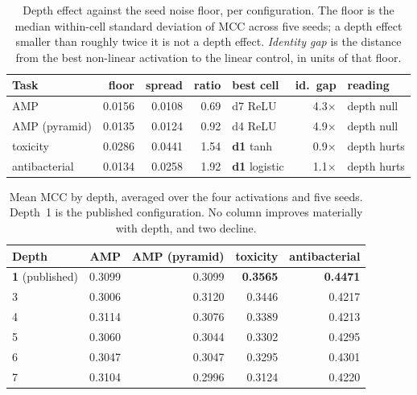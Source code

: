 \documentclass[11pt,a4paper]{article}
\begin{document}
\begin{table}[htbp]\centering\small
\caption{Depth effect against the seed noise floor, per configuration. The floor is the
median within-cell standard deviation of MCC across five seeds; a depth effect smaller than
roughly twice it is not a depth effect. \emph{Identity gap} is the distance from the best
non-linear activation to the linear control, in units of that floor.}
\label{tab:ablsummary}
\begin{tabular}{lrrrlrl}
\toprule
Task & floor & spread & ratio & best cell & id.\ gap & reading \\
\midrule
AMP            & 0.0156 & 0.0108 & 0.69 & d7 ReLU              & 4.3$\times$ & depth null \\
AMP (pyramid)  & 0.0135 & 0.0124 & 0.92 & d4 ReLU              & 4.9$\times$ & depth null \\
toxicity       & 0.0286 & 0.0441 & 1.54 & \textbf{d1} tanh     & 0.9$\times$ & depth hurts \\
antibacterial  & 0.0134 & 0.0258 & 1.92 & \textbf{d1} logistic & 1.1$\times$ & depth hurts \\
\bottomrule
\end{tabular}
\end{table}

\begin{table}[htbp]\centering\small
\caption{Mean MCC by depth, averaged over the four activations and five seeds. Depth~1 is
the published configuration. No column improves materially with depth, and two decline.}
\label{tab:abldepth}
\begin{tabular}{lrrrr}
\toprule
Depth & AMP & AMP (pyramid) & toxicity & antibacterial \\
\midrule
\textbf{1} (published) & 0.3099 & 0.3099 & \textbf{0.3565} & \textbf{0.4471} \\
3 & 0.3006 & 0.3120 & 0.3446 & 0.4217 \\
4 & 0.3114 & 0.3076 & 0.3389 & 0.4213 \\
5 & 0.3060 & 0.3044 & 0.3302 & 0.4295 \\
6 & 0.3047 & 0.3047 & 0.3295 & 0.4301 \\
7 & 0.3104 & 0.2996 & 0.3124 & 0.4220 \\
\bottomrule
\end{tabular}
\end{table}
\end{document}
